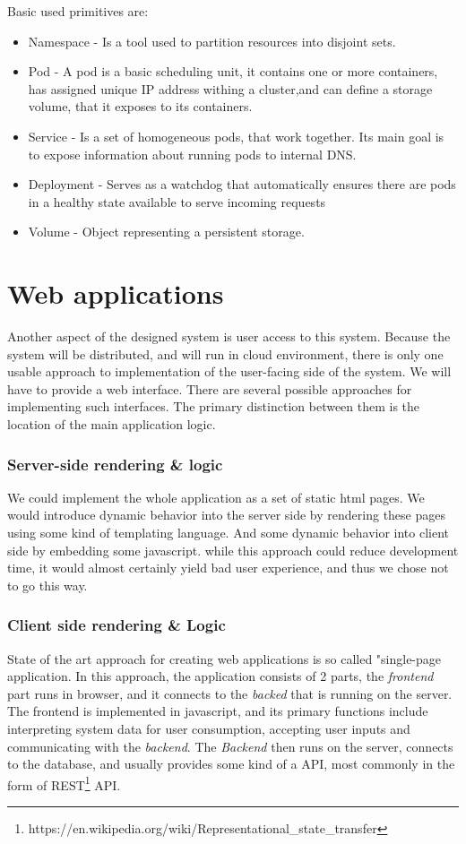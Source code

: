 Basic used primitives are:
\begin{itemize}
    \item Namespace - Is a tool used to partition resources into disjoint sets.
    \item Pod - A pod is a basic scheduling unit, it contains one or more containers, has assigned unique IP address
    withing a cluster,and can define a storage volume, that it exposes to its containers.
    \item Service - Is a set of homogeneous pods, that work together. Its main goal is to expose information about running
    pods to internal DNS.
    \item Deployment - Serves as a watchdog that automatically ensures there are pods in a healthy state available to
    serve incoming requests
    \item Volume - Object representing a persistent storage.
\end{itemize}



\section{Web applications}
Another aspect of the designed system is user access to this system. Because the system will be distributed, and will run
in cloud environment, there is only one usable approach to implementation of the user-facing side of the system.
We will have to provide a web interface. There are several possible approaches for implementing such interfaces. The primary
distinction between them is the location of the main application logic.

\subsubsection{Server-side rendering \& logic}
We could implement the whole application as a set of static html pages. We would introduce dynamic behavior into
the server side by rendering these pages using some kind of templating language. And some dynamic behavior
into client side by embedding some javascript. while this approach could reduce development time, it would
almost certainly yield bad user experience, and thus we chose not to go this way.

\subsubsection{Client side rendering \& Logic}
State of the art approach for creating web applications is so called "single-page application. In this approach,
the application consists of 2 parts, the \textit{frontend} part runs in browser, and it connects to the \textit{backed}
that is running on the server. The frontend is implemented in javascript, and its primary functions include interpreting system
data for user consumption, accepting user inputs and communicating with the \textit{backend}. The \textit{Backend} then
runs on the server, connects to the database, and usually provides some kind of a API, most commonly in the form of REST\footnote{https://en.wikipedia.org/wiki/Representational\_state\_transfer} API.

